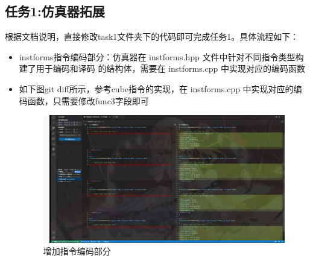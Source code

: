 \documentclass[12pt,hyperref,a4paper,UTF8]{ctexart}
\begin{document}
\subsection{任务1:仿真器拓展}
根据文档说明，直接修改task1文件夹下的代码即可完成任务1。具体流程如下：
\begin{itemize}
    \item instforms指令编码部分：仿真器在 instforms.hpp 文件中针对不同指令类型构建了用于编码和译码
的结构体，需要在 instforms.cpp 中实现对应的编码函数
    \item 如下图git diff所示，参考cube指令的实现，在 instforms.cpp 中实现对应的编码函数，只需要修改func3字段即可
  \begin{figure}[H]
      \centering
      \includegraphics[width =1.0\textwidth]{figures/fig/image2.png}
      \caption{增加指令编码部分}
  \end{figure}


\end{itemize}
\end{document}
